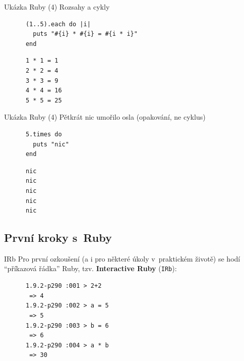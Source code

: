 \documentclass{beamer}
\begin{document}
\begin{frame}[fragile]{Ukázka Ruby (4)}
  Rozsahy a cykly
  \begin{block}{}
    \smallskip \footnotesize
    {\scriptsize \begin{verbatim}
      (1..5).each do |i|
        puts "#{i} * #{i} = #{i * i}"
      end
    \end{verbatim}}
  \end{block}
  \pause
  \begin{block}{}
    \smallskip \footnotesize
    {\scriptsize \begin{verbatim}
      1 * 1 = 1
      2 * 2 = 4
      3 * 3 = 9
      4 * 4 = 16
      5 * 5 = 25
    \end{verbatim}}
  \end{block}
\end{frame}


\begin{frame}[fragile]{Ukázka Ruby (4)}
  Pětkrát nic umořilo osla (opakování, ne cyklus)
  \begin{block}{}
    \smallskip \footnotesize
    {\scriptsize \begin{verbatim}
      5.times do
        puts "nic"
      end
    \end{verbatim}}
  \end{block}
  \pause
  \begin{block}{}
    \smallskip \footnotesize
    {\scriptsize \begin{verbatim}
      nic
      nic
      nic
      nic
      nic
    \end{verbatim}}
  \end{block}
\end{frame}

\subsection{První kroky s~Ruby}

\begin{frame}[fragile]{IRb}
  Pro první ozkoušení (a i pro některé úkoly v~praktickém životě) se hodí ``příkazová řádka'' Ruby, tzv. \textbf{Interactive Ruby} (\texttt{IRb}):
  \pause
  \begin{block}{}
    {\scriptsize \begin{verbatim}
      1.9.2-p290 :001 > 2+2
       => 4
      1.9.2-p290 :002 > a = 5
       => 5
      1.9.2-p290 :003 > b = 6
       => 6
      1.9.2-p290 :004 > a * b
       => 30
    \end{verbatim}}
  \end{block}

\end{frame}
\end{document}
